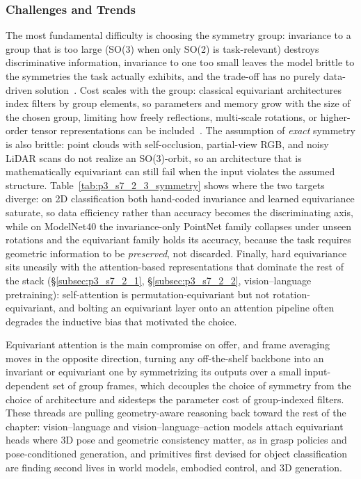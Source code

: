 \subsubsection{Challenges and Trends}
The most fundamental difficulty is choosing the symmetry group: invariance to a group that is too large (SO(3) when only SO(2) is task-relevant) destroys discriminative information, invariance to one too small leaves the model brittle to the symmetries the task actually exhibits, and the trade-off has no purely data-driven solution~\cite{cohen2016group,cohen2017steerable}.
Cost scales with the group: classical equivariant architectures index filters by group elements, so parameters and memory grow with the size of the chosen group, limiting how freely reflections, multi-scale rotations, or higher-order tensor representations can be included~\cite{weiler2019general}.
The assumption of \emph{exact} symmetry is also brittle: point clouds with self-occlusion, partial-view RGB, and noisy LiDAR scans do not realize an SO(3)-orbit, so an architecture that is mathematically equivariant can still fail when the input violates the assumed structure.
Table~\ref{tab:p3_s7_2_3_symmetry} shows where the two targets diverge: on 2D classification both hand-coded invariance and learned equivariance saturate, so data efficiency rather than accuracy becomes the discriminating axis, while on ModelNet40 the invariance-only PointNet family collapses under unseen rotations and the equivariant family holds its accuracy, because the task requires geometric information to be \emph{preserved}, not discarded.
Finally, hard equivariance sits uneasily with the attention-based representations that dominate the rest of the stack (§\ref{subsec:p3_s7_2_1}, §\ref{subsec:p3_s7_2_2}, vision--language pretraining): self-attention is permutation-equivariant but not rotation-equivariant, and bolting an equivariant layer onto an attention pipeline often degrades the inductive bias that motivated the choice.

Equivariant attention is the main compromise on offer, and frame averaging~\cite{puny2022frameaveraging} moves in the opposite direction, turning any off-the-shelf backbone into an invariant or equivariant one by symmetrizing its outputs over a small input-dependent set of group frames, which decouples the choice of symmetry from the choice of architecture and sidesteps the parameter cost of group-indexed filters.
These threads are pulling geometry-aware reasoning back toward the rest of the chapter: vision--language and vision--language--action models attach equivariant heads where 3D pose and geometric consistency matter, as in grasp policies and pose-conditioned generation, and primitives first devised for object classification are finding second lives in world models, embodied control, and 3D generation.


